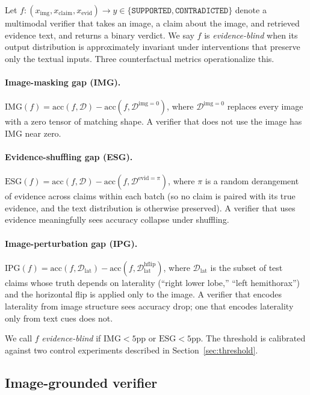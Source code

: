 \documentclass[11pt]{article}
\begin{document}
Let $f: (x_{\text{img}}, x_{\text{claim}}, x_{\text{evid}}) \to y \in \{\texttt{SUPPORTED}, \texttt{CONTRADICTED}\}$ denote a multimodal verifier that takes an image, a claim about the image, and retrieved evidence text, and returns a binary verdict. We say $f$ is \emph{evidence-blind} when its output distribution is approximately invariant under interventions that preserve only the textual inputs. Three counterfactual metrics operationalize this.

\paragraph{Image-masking gap (IMG).} $\text{IMG}(f) = \text{acc}(f, \mathcal{D}) - \text{acc}(f, \mathcal{D}^{\text{img}=0})$, where $\mathcal{D}^{\text{img}=0}$ replaces every image with a zero tensor of matching shape. A verifier that does not use the image has IMG near zero.

\paragraph{Evidence-shuffling gap (ESG).} $\text{ESG}(f) = \text{acc}(f, \mathcal{D}) - \text{acc}(f, \mathcal{D}^{\text{evid}=\pi})$, where $\pi$ is a random derangement of evidence across claims within each batch (so no claim is paired with its true evidence, and the text distribution is otherwise preserved). A verifier that uses evidence meaningfully sees accuracy collapse under shuffling.

\paragraph{Image-perturbation gap (IPG).} $\text{IPG}(f) = \text{acc}(f, \mathcal{D}_{\text{lat}}) - \text{acc}(f, \mathcal{D}_{\text{lat}}^{\text{hflip}})$, where $\mathcal{D}_{\text{lat}}$ is the subset of test claims whose truth depends on laterality (``right lower lobe,'' ``left hemithorax'') and the horizontal flip is applied only to the image. A verifier that encodes laterality from image structure sees accuracy drop; one that encodes laterality only from text cues does not.

We call $f$ \emph{evidence-blind} if $\text{IMG} < 5\text{pp}$ or $\text{ESG} < 5\text{pp}$. The threshold is calibrated against two control experiments described in Section~\ref{sec:threshold}.

\subsection{Image-grounded verifier}
\end{document}
